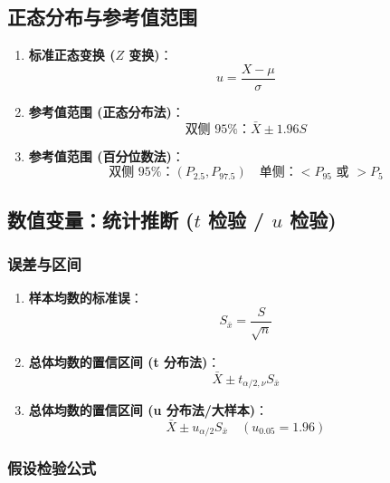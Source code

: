 \documentclass[lang=cn,10pt]{elegantbook}
\begin{document}
\subsection{正态分布与参考值范围}

\begin{enumerate}
    \item \textbf{标准正态变换 ($Z$ 变换)}：
    \[ u = \frac{X - \mu}{\sigma} \]
    \item \textbf{参考值范围 (正态分布法)}：
    \[ \text{双侧 95\%}：\bar{X} \pm 1.96S \]
    \item \textbf{参考值范围 (百分位数法)}：
    \[ \text{双侧 95\%}：(P_{2.5}, P_{97.5}) \quad \text{单侧}：<P_{95} \text{ 或 } >P_5 \]
\end{enumerate}

\subsection{数值变量：统计推断 ($t$ 检验 / $u$ 检验)}

\subsubsection{误差与区间}
\begin{enumerate}
    \item \textbf{样本均数的标准误}：
    \[ S_{\bar{x}} = \frac{S}{\sqrt{n}} \]
    \item \textbf{总体均数的置信区间 (t 分布法)}：
    \[ \bar{X} \pm t_{\alpha/2, \nu} S_{\bar{x}} \]
    \item \textbf{总体均数的置信区间 (u 分布法/大样本)}：
    \[ \bar{X} \pm u_{\alpha/2} S_{\bar{x}} \quad (u_{0.05}=1.96) \]
\end{enumerate}

\subsubsection{假设检验公式}
\end{document}

